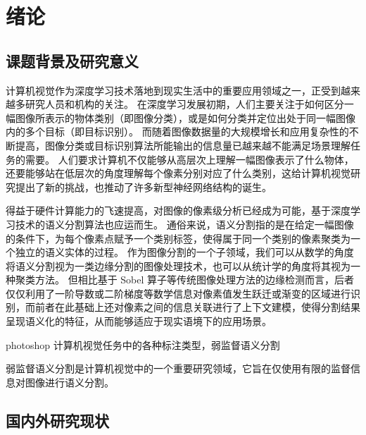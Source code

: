 \chapter{绪论}
\section{课题背景及研究意义}
计算机视觉作为深度学习技术落地到现实生活中的重要应用领域之一，正受到越来越多研究人员和机构的关注。
在深度学习发展初期，人们主要关注于如何区分一幅图像所表示的物体类别（即图像分类），或是如何分类并定位出处于同一幅图像内的多个目标（即目标识别）。
而随着图像数据量的大规模增长和应用复杂性的不断提高，图像分类或目标识别算法所能输出的信息量已越来越不能满足场景理解任务的需要。
人们要求计算机不仅能够从高层次上理解一幅图像表示了什么物体，还要能够站在低层次的角度理解每个像素分别对应了什么类别，这给计算机视觉研究提出了新的挑战，也推动了许多新型神经网络结构的诞生。
\par
得益于硬件计算能力的飞速提高，对图像的像素级分析已经成为可能，基于深度学习技术的语义分割算法也应运而生。
通俗来说，语义分割指的是在给定一幅图像的条件下，为每个像素点赋予一个类别标签，使得属于同一个类别的像素聚类为一个独立的语义实体的过程。
作为图像分割的一个子领域，我们可以从数学的角度将语义分割视为一类边缘分割的图像处理技术，也可以从统计学的角度将其视为一种聚类方法。
但相比基于 Sobel 算子等传统图像处理方法的边缘检测而言，后者仅仅利用了一阶导数或二阶梯度等数学信息对像素值发生跃迁或渐变的区域进行识别，而前者在此基础上还对像素之间的信息关联进行了上下文建模，使得分割结果呈现语义化的特征，从而能够适应于现实语境下的应用场景。
\par
photoshop
计算机视觉任务中的各种标注类型，弱监督语义分割

弱监督语义分割是计算机视觉中的一个重要研究领域，它旨在仅使用有限的监督信息对图像进行语义分割。
\section{国内外研究现状}
